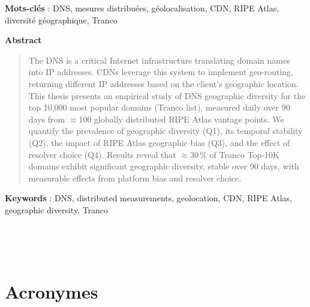 \documentclass[a4paper,11pt]{book}
\begin{document}
\bigskip
\noindent\textbf{Mots-clés} : DNS, mesures distribuées, géolocalisation, CDN, RIPE Atlas, diversité géographique, Tranco

\vspace{0.75cm}

\noindent\textbf{\huge Abstract}
\bigskip

\begin{quote}
The DNS is a critical Internet infrastructure translating domain names into IP addresses. CDNs leverage this system to implement geo-routing, returning different IP addresses based on the client's geographic location. This thesis presents an empirical study of DNS geographic diversity for the top 10,000 most popular domains (Tranco list), measured daily over 90 days from $\approx$100 globally distributed RIPE Atlas vantage points. We quantify the prevalence of geographic diversity (Q1), its temporal stability (Q2), the impact of RIPE Atlas geographic bias (Q3), and the effect of resolver choice (Q4). Results reveal that $\approx$30\,\% of Tranco Top-10K domains exhibit significant geographic diversity, stable over 90 days, with measurable effects from platform bias and resolver choice.
\end{quote}

\bigskip
\noindent\textbf{Keywords} : DNS, distributed measurements, geolocation, CDN, RIPE Atlas, geographic diversity, Tranco

\clearpage\newpage\hbox{ }\clearpage\newpage

\tableofcontents

\clearpage\newpage\hbox{ }\clearpage\newpage
\pagestyle{empty}

\section*{Acronymes}
\end{document}
